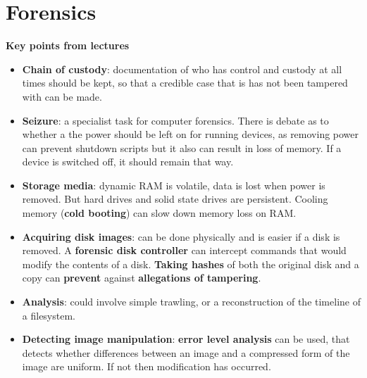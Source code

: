 \documentclass{article}
\begin{document}
\section{Forensics}
\textbf{Key points from lectures}
\begin{itemize}
	\item \textbf{Chain of custody}: documentation of who has control and custody at all times should be kept, so that a credible case that is has not been tampered with can be made.
	\item \textbf{Seizure}: a specialist task for computer forensics. There is debate as to whether a the power should be left on for running devices, as removing power can prevent shutdown scripts but it also can result in loss of memory. If a device is switched off, it should remain that way.
	\item \textbf{Storage media}: dynamic RAM is volatile, data is lost when power is removed. But hard drives and solid state drives are persistent. Cooling memory (\textbf{cold booting}) can slow down memory loss on RAM.
	\item \textbf{Acquiring disk images}: can be done physically and is easier if a disk is removed. A \textbf{forensic disk controller} can intercept commands that would modify the contents of a disk. \textbf{Taking hashes} of both the original disk and a copy can \textbf{prevent} against \textbf{allegations of tampering}.
	\item \textbf{Analysis}: could involve simple trawling, or a reconstruction of the timeline of a filesystem.
	\item  \textbf{Detecting image manipulation}: \textbf{error level analysis} can be used, that detects whether differences between an image and a compressed form of the image are uniform. If not then modification has occurred.
\end{itemize}
\end{document}
